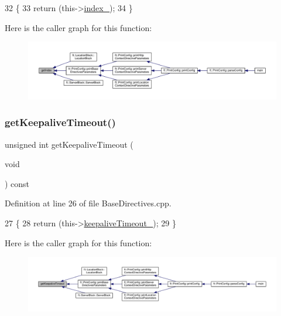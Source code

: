 \begin{DoxyCode}
32     \{
33         \textcolor{keywordflow}{return} (this->\hyperlink{classft_1_1_base_directives_a6ba30626837f300201cd32c35d50aa49}{index\_});
34     \}
\end{DoxyCode}
Here is the caller graph for this function\+:
\nopagebreak
\begin{figure}[H]
\begin{center}
\leavevmode
\includegraphics[width=350pt]{classft_1_1_base_directives_a018f34a5ffd66e891494b5c0ee69177b_icgraph}
\end{center}
\end{figure}
\mbox{\label{classft_1_1_base_directives_ab8574338758f65325cab5d1c394826c8}} 
\subsubsection{\texorpdfstring{get\+Keepalive\+Timeout()}{getKeepaliveTimeout()}}
{\footnotesize\ttfamily unsigned int get\+Keepalive\+Timeout (\begin{DoxyParamCaption}\item[{void}]{ }\end{DoxyParamCaption}) const\hspace{0.3cm}{\ttfamily [inherited]}}



Definition at line 26 of file Base\+Directives.\+cpp.


\begin{DoxyCode}
27     \{
28         \textcolor{keywordflow}{return} (this->\hyperlink{classft_1_1_base_directives_aa1f5f394b428d0d18765a9b9e14e648f}{keepaliveTimeout\_});
29     \}
\end{DoxyCode}
Here is the caller graph for this function\+:
\nopagebreak
\begin{figure}[H]
\begin{center}
\leavevmode
\includegraphics[width=350pt]{classft_1_1_base_directives_ab8574338758f65325cab5d1c394826c8_icgraph}
\end{center}
\end{figure}
\mbox{\label{classft_1_1_server_block_a2e03d2c2635620f103971ff8031779a7}} 

